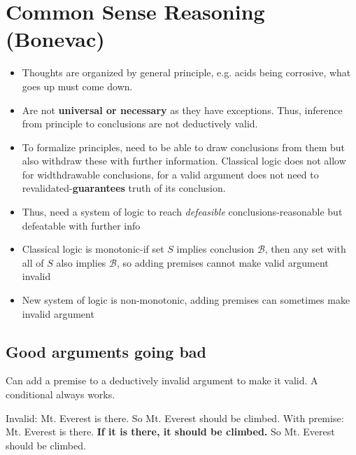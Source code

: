 \section{Common Sense Reasoning (Bonevac)}

\begin{itemize}  
    \item Thoughts are organized by general principle, 
    e.g. acids being corrosive, what goes up must come down.
    \item Are not \textbf{universal or necessary} as they have exceptions.
    Thus, inference from principle to conclusions are not deductively valid.
    \item To formalize principles, need to be able to draw conclusions from them but also withdraw these
    with further information. Classical logic does not allow for widthdrawable conclusions, for a valid argument does not need to
    revalidated-\textbf{guarantees} truth of its conclusion.
    \item Thus, need a system of logic to reach \textit{defeasible} conclusions-reasonable but defeatable with further info
    \item Classical logic is monotonic-if set $S$ implies conclusion $\mathcal{B}$, then any set with all of $S$ also implies $\mathcal{B}$, so adding premises cannot make valid argument invalid
    \item New system of logic is non-monotonic, adding premises can sometimes make invalid argument
\end{itemize}

\subsection{Good arguments going bad}

Can add a premise to a deductively invalid argument to make it valid. A conditional always works.

\begin{example}
    Invalid: Mt. Everest is there. So Mt. Everest should be climbed.\newline
    With premise: Mt. Everest is there. \textbf{If it is there, it should be climbed.} So Mt. Everest should be climbed.
\end{example}

